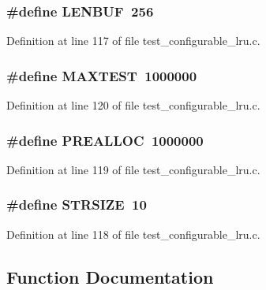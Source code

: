 \subsubsection[{LENBUF}]{\setlength{\rightskip}{0pt plus 5cm}\#define LENBUF~256}\label{test__configurable__lru_8c_799f2d62ff1a8069195e037a3b7905ae}




Definition at line 117 of file test\_\-configurable\_\-lru.c.
\subsubsection[{MAXTEST}]{\setlength{\rightskip}{0pt plus 5cm}\#define MAXTEST~1000000}\label{test__configurable__lru_8c_03d9dd35a7b43ebc597de16d46a0e845}




Definition at line 120 of file test\_\-configurable\_\-lru.c.
\subsubsection[{PREALLOC}]{\setlength{\rightskip}{0pt plus 5cm}\#define PREALLOC~1000000}\label{test__configurable__lru_8c_9dadacd5ee41d21ea8974d66757983dd}




Definition at line 119 of file test\_\-configurable\_\-lru.c.
\subsubsection[{STRSIZE}]{\setlength{\rightskip}{0pt plus 5cm}\#define STRSIZE~10}\label{test__configurable__lru_8c_29e632a035b9d4c4b6225bb936eb8097}




Definition at line 118 of file test\_\-configurable\_\-lru.c.

\subsection{Function Documentation}
